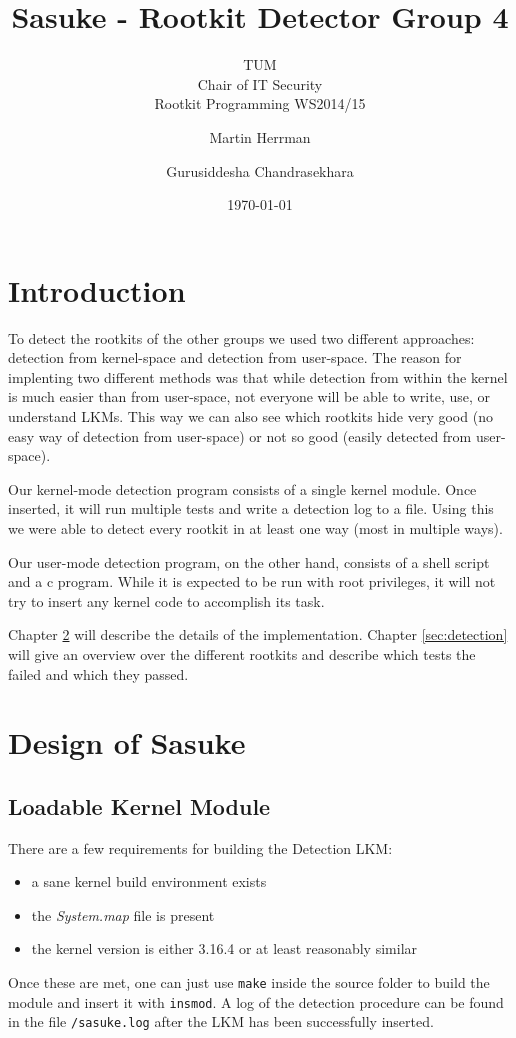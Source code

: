 \documentclass[10pt, letterpaper]{scrartcl}
\title{Sasuke - Rootkit Detector Group 4}
\subtitle{TUM \\Chair of IT Security\\  Rootkit Programming WS2014/15}
\author{Martin Herrman \and Gurusiddesha Chandrasekhara}
\date{\today}
\begin{document}
\maketitle
\tableofcontents
\newpage

\section{Introduction}
To detect the rootkits of the other groups we used two different approaches: detection from kernel-space and detection from user-space.
The reason for implenting two different methods was that while detection from within the kernel is much easier than from user-space, not everyone will be able to write, use, or understand LKMs.
This way we can also see which rootkits hide very good (no easy way of detection from user-space) or not so good (easily detected from user-space). 

Our kernel-mode detection program consists of a single kernel module.
Once inserted, it will run multiple tests and write a detection log to a file.
Using this we were able to detect every rootkit in at least one way (most in multiple ways).

Our user-mode detection program, on the other hand, consists of a shell script and a c program.
While it is expected to be run with root privileges, it will not try to insert any kernel code to accomplish its task.

Chapter \ref{sec:design} will describe the details of the implementation. Chapter \ref{sec:detection} will give an overview over the different rootkits and describe which tests the failed and which they passed.

\section{Design of Sasuke}\label{sec:design}

\subsection{Loadable Kernel Module}\label{sec:lkm}
There are a few requirements for building the Detection LKM: 
\begin{itemize}
	\item a sane kernel build environment exists
	\item the \emph{System.map} file is present
	\item the kernel version is either 3.16.4 or at least reasonably similar
\end{itemize}
Once these are met, one can just use \texttt{make} inside the source folder to build the module and insert it with \texttt{insmod}. A log of the detection procedure can be found in the file \texttt{/sasuke.log} after the LKM has been successfully inserted.
\end{document}
